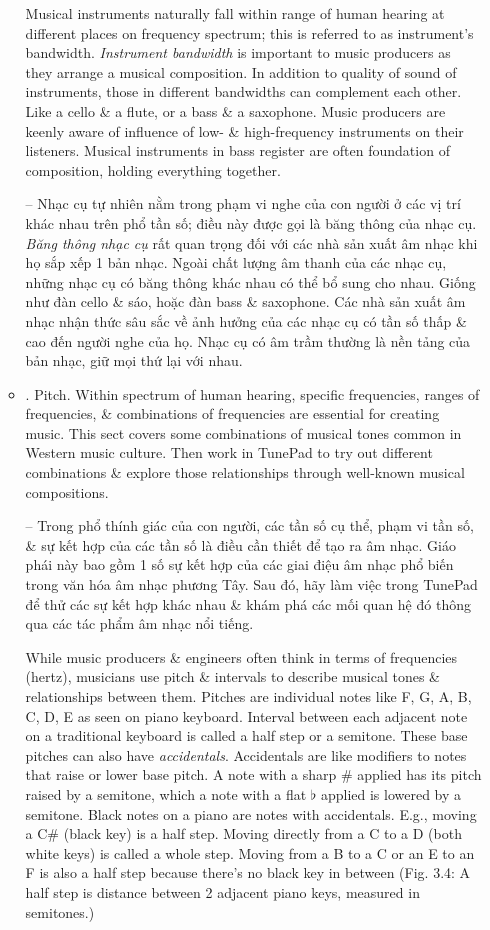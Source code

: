 \documentclass{article}
\begin{document}
\begin{itemize}
\begin{itemize}
		Musical instruments naturally fall within range of human hearing at different places on frequency spectrum; this is referred to as instrument's bandwidth. {\it Instrument bandwidth} is important to music producers as they arrange a musical composition. In addition to quality of sound of instruments, those in different bandwidths can complement each other. Like a cello \& a flute, or a bass \& a saxophone. Music producers are keenly aware of influence of low- \& high-frequency instruments on their listeners. Musical instruments in bass register are often foundation of composition, holding everything together.
		
		-- Nhạc cụ tự nhiên nằm trong phạm vi nghe của con người ở các vị trí khác nhau trên phổ tần số; điều này được gọi là băng thông của nhạc cụ. {\it Băng thông nhạc cụ} rất quan trọng đối với các nhà sản xuất âm nhạc khi họ sắp xếp 1 bản nhạc. Ngoài chất lượng âm thanh của các nhạc cụ, những nhạc cụ có băng thông khác nhau có thể bổ sung cho nhau. Giống như đàn cello \& sáo, hoặc đàn bass \& saxophone. Các nhà sản xuất âm nhạc nhận thức sâu sắc về ảnh hưởng của các nhạc cụ có tần số thấp \& cao đến người nghe của họ. Nhạc cụ có âm trầm thường là nền tảng của bản nhạc, giữ mọi thứ lại với nhau.
		\item {. Pitch.} Within spectrum of human hearing, specific frequencies, ranges of frequencies, \& combinations of frequencies are essential for creating music. This sect covers some combinations of musical tones common in Western music culture. Then work in TunePad to try out different combinations \& explore those relationships through well-known musical compositions.
		
		-- Trong phổ thính giác của con người, các tần số cụ thể, phạm vi tần số, \& sự kết hợp của các tần số là điều cần thiết để tạo ra âm nhạc. Giáo phái này bao gồm 1 số sự kết hợp của các giai điệu âm nhạc phổ biến trong văn hóa âm nhạc phương Tây. Sau đó, hãy làm việc trong TunePad để thử các sự kết hợp khác nhau \& khám phá các mối quan hệ đó thông qua các tác phẩm âm nhạc nổi tiếng.
		
		While music producers \& engineers often think in terms of frequencies (hertz), musicians use pitch \& intervals to describe musical tones \& relationships between them. Pitches are individual notes like F, G, A, B, C, D, E as seen on piano keyboard. Interval between each adjacent note on a traditional keyboard is called a half step or a semitone. These base pitches can also have {\it accidentals}. Accidentals are like modifiers to notes that raise or lower base pitch. A note with a sharp \# applied has its pitch raised by a semitone, which a note with a flat $\flat$ applied is lowered by a semitone. Black notes on a piano are notes with accidentals. E.g., moving a C\# (black key) is a half step. Moving directly from a C to a D (both white keys) is called a whole step. Moving from a B to a C or an E to an F is also a half step because there's no black key in between ({\sf Fig. 3.4: A half step is distance between 2 adjacent piano keys, measured in semitones.})
		

\end{itemize}
\end{itemize}
\end{document}
